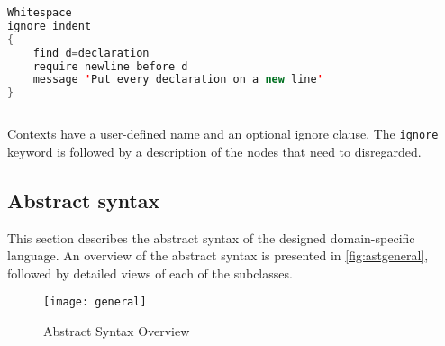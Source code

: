 \begin{sourcecode}
\begin{lstlisting}[style=mono,language=Java]
Whitespace
ignore indent 
{
    find d=declaration
    require newline before d
    message 'Put every declaration on a new line'
}
\end{lstlisting}
\end{sourcecode}

Contexts have a user-defined name and an optional ignore clause. The \texttt{ignore} keyword is
followed by a description of the nodes that need to disregarded.

\subsection{Abstract syntax}

This section describes the abstract syntax of the designed domain-specific language. An overview of
the abstract syntax is presented in \autoref{fig:astgeneral}, followed by detailed views of each
of the subclasses.

\begin{figure}[h]
  \centering
  \caption{Abstract Syntax Overview}
  \label{fig:astgeneral}
  \texttt{[image: general]}
\end{figure}


